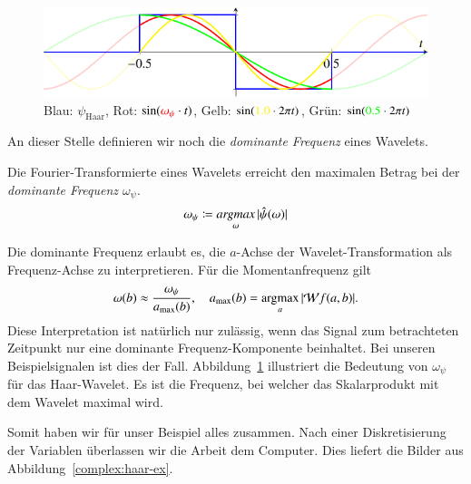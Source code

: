 \begin{figure}
	\centering
	\includegraphics{papers/complex/images/haar_dom.pdf}
	
	\caption{Blau: $\psi_\text{Haar}$, Rot: $\sin ({\color{red}\omega_\psi}\cdot t)$, Gelb: $\sin ({\color{yellow}1.0}\cdot 2\pi t)$, Grün: $\sin ({\color{green}0.5}\cdot 2\pi t)$}
	\label{complex:dom-freq}
\end{figure}
An dieser Stelle definieren wir noch die \emph{dominante Frequenz} eines Wavelets.
\begin{definition}
	Die Fourier-Transformierte eines Wavelets erreicht den maximalen Betrag bei der \emph{dominante Frequenz $\omega_\psi$}.
	\begin{equation}
		\omega_\psi \coloneqq \underset{\omega}{\text{\emph{argmax}}} \, |\hat\psi(\omega)|
	\end{equation}
	
\end{definition}

Die dominante Frequenz erlaubt es, die $a$-Achse der Wavelet-Transformation als Frequenz-Achse zu interpretieren.
Für die Momentanfrequenz gilt
\[
	\omega(b) \approx \frac{\omega_\psi}{a_\text{max}(b)},
	\quad 
	a_\text{max}(b)
	= 
	\underset{a}{\text{argmax}} \, |\!\Wave f(a,b)|.
\]
Diese Interpretation ist natürlich nur zulässig, wenn das Signal zum betrachteten Zeitpunkt nur eine dominante Frequenz-Komponente beinhaltet.
Bei unseren Beispielsignalen ist dies der Fall.
Abbildung~\ref{complex:dom-freq} illustriert die Bedeutung von $\omega_\psi$ für das Haar-Wavelet.
Es ist die Frequenz, bei welcher das Skalarprodukt mit dem Wavelet maximal wird.

Somit haben wir für unser Beispiel alles zusammen.
Nach einer Diskretisierung der Variablen überlassen wir die Arbeit dem Computer.
Dies liefert die Bilder aus Abbildung~\ref{complex:haar-ex}.

